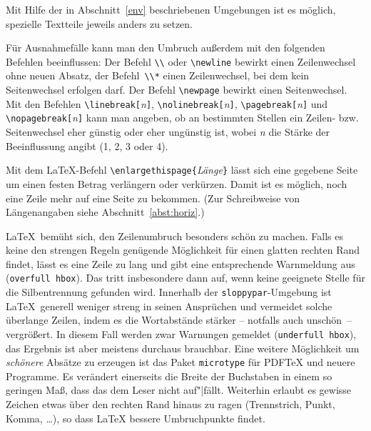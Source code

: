 Mit Hilfe der in Abschnitt~\ref{env} beschriebenen Umgebungen ist
es möglich, spezielle Textteile jeweils anders zu setzen.

Für Ausnahmefälle kann man den Umbruch außerdem mit den
folgenden Befehlen beeinflussen:
Der Befehl \lstinline|\\| oder \lstinline|\newline| bewirkt einen
Zeilenwechsel ohne neuen Absatz, der Befehl~\lstinline|\\*| einen
Zeilenwechsel, bei dem kein Seitenwechsel erfolgen darf.
Der Befehl \lstinline|\newpage| bewirkt einen Seitenwechsel.
Mit den Befehlen
\lstinline|\linebreak[|\textit{n}\lstinline|]|,
\lstinline|\nolinebreak[|\textit{n}\lstinline|]|,
\lstinline|\pagebreak[|\textit{n}\lstinline|]|   und
\lstinline|\nopagebreak[|\textit{n}\lstinline|]|
kann man angeben, ob an bestimmten Stellen ein Zeilen- bzw.\ %
Seitenwechsel eher günstig oder eher ungünstig ist, wobei
\textit{n} die Stärke der Beeinflussung angibt (1, 2, 3 oder 4).

Mit dem \LaTeX-Befehl \lstinline:\enlargethispage{:\textit{Länge}\lstinline:}:
lässt sich eine gegebene Seite um einen festen Betrag
verlängern oder verkürzen. Damit ist es möglich, noch
eine Zeile mehr auf eine Seite zu bekommen.
(Zur Schreibweise von Längenangaben siehe Abschnitt~\ref{abst:horiz}.)


\LaTeX\ bemüht sich, den Zeilenumbruch besonders schön zu machen.  Falls es
keine den strengen Regeln genügende Möglichkeit für einen glatten rechten Rand
findet, lässt es eine Zeile zu lang und gibt eine entsprechende Warnmeldung
aus (\texttt{over\-full hbox}). Das tritt insbesondere dann auf, wenn keine
geeignete Stelle für die Silbentrennung gefunden wird. Innerhalb der
\texttt{sloppypar}-Umgebung ist \LaTeX\ generell weniger streng in seinen
Ansprüchen und vermeidet solche überlange Zeilen, indem es die Wortabstände
stärker -- notfalls auch unschön~-- vergrößert. In diesem Fall werden zwar
Warnungen gemeldet (\texttt{under\-full hbox}), das Ergebnis ist aber meistens
durchaus brauchbar. Eine weitere Möglichkeit um \textit{schönere}  Absätze zu
erzeugen ist das Paket \texttt{microtype} für PDF\TeX{} und neuere Programme.
Es verändert einerseits die Breite der Buchstaben in einem so geringen Maß,
dass das dem Leser nicht auf"|fällt. Weiterhin erlaubt es gewisse Zeichen
etwas über den rechten Rand hinaus zu ragen (Trennstrich, Punkt, Komma,
\dots), so dass \LaTeX{} bessere Umbruchpunkte findet.



